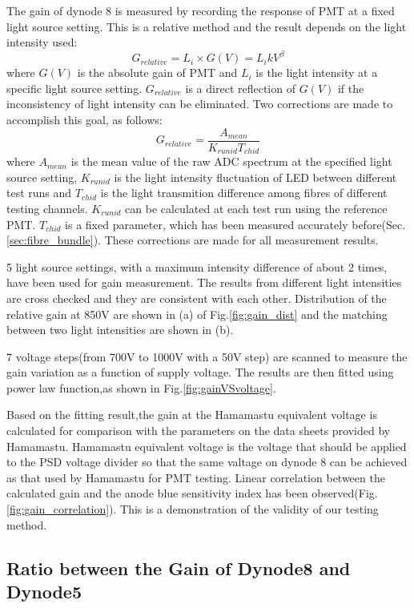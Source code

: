 \documentclass[5p, times]{elsarticle}
\begin{document}
The gain of dynode 8 is measured by recording the response of PMT at a fixed light source setting. 
This is a relative method and the result depends on the light intensity used:
\begin{equation}
 G_{relative} = L_i \times G(V) = L_i k V^\beta
\end{equation}
where $G(V)$ is the absolute gain of PMT and $L_i$ is the light intensity at a specific light source setting.
$G_{relative}$ is a direct reflection of $G(V)$ if the inconsistency of light intensity can be eliminated.
Two corrections are made to accomplish this goal, as follows: 
\begin{equation}
 G_{relative} = \frac{A_{mean}}{K_{runid} T_{chid}}
\end{equation} 
where $A_{mean}$ is the mean value of the raw ADC spectrum at the specified light source setting,
$K_{runid}$ is the light intensity fluctuation of LED between different test runs and $T_{chid}$ is the light transmition difference among fibres of different testing channels.
$K_{runid}$ can be calculated at each test run using the reference PMT.
$T_{chid}$ is a fixed parameter, which has been measured accurately before(Sec.\ref{sec:fibre_bundle}).
These corrections are made for all measurement results.

5 light source settings, with a maximum intensity difference of about 2 times, have been used for gain measurement.
The results from different light intensities are cross checked and they are consistent with each other.
Distribution of the relative gain at 850V are shown in (a) of Fig.\ref{fig:gain_dist} and the matching between two light intensities are shown in (b).

7 voltage steps(from 700V to 1000V with a 50V step) are scanned to measure the gain variation as a function of supply voltage.
The results are then fitted using power law function,as shown in Fig.\ref{fig:gainVSvoltage}.

Based on the fitting result,the gain at the Hamamastu equivalent voltage is calculated for comparison with the parameters on the data sheets provided by Hamamastu.
Hamamastu equivalent voltage is the voltage that should be applied to the PSD voltage divider so that the same valtage on dynode 8 can be achieved as that used by Hamamastu for PMT testing.
Linear correlation between the calculated gain and the anode blue sensitivity index has been observed(Fig.\ref{fig:gain_correlation}).
This is a demonstration of the validity of our testing method.

\subsection{Ratio between the Gain of Dynode8 and Dynode5}
\label{sec:psd_dy58}
\end{document}
